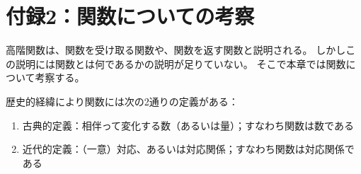 \documentclass[11pt,a4paper]{ltjsarticle}
\begin{document}




















\section{付録2：関数についての考察}

高階関数は、関数を受け取る関数や、関数を返す関数と説明される。
しかしこの説明には関数とは何であるかの説明が足りていない。
そこで本章では関数について考察する。

歴史的経緯により関数には次の2通りの定義がある\cite{koda}：


\begin{enumerate}
  \item 古典的定義：相伴って変化する数（あるいは量）；すなわち関数は数である
  \item 近代的定義：（一意）対応、あるいは対応関係；すなわち関数は対応関係である
\end{enumerate}
\end{document}
